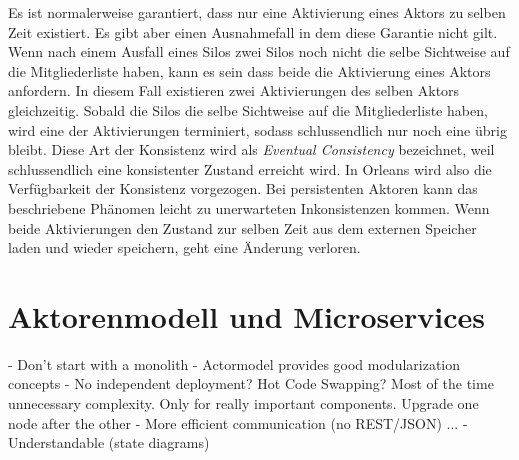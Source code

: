 Es ist normalerweise garantiert, dass nur eine Aktivierung eines Aktors zu selben Zeit existiert. Es gibt aber einen Ausnahmefall in dem diese Garantie nicht gilt. Wenn nach einem Ausfall eines Silos zwei Silos noch nicht die selbe Sichtweise auf die Mitgliederliste haben, kann es sein dass beide die Aktivierung eines Aktors anfordern. In diesem Fall existieren zwei Aktivierungen des selben Aktors gleichzeitig. Sobald die Silos die selbe Sichtweise auf die Mitgliederliste haben, wird eine der Aktivierungen terminiert, sodass schlussendlich nur noch eine übrig bleibt. Diese Art der Konsistenz wird als \textit{Eventual Consistency} bezeichnet, weil schlussendlich eine konsistenter Zustand erreicht wird. In Orleans wird also die Verfügbarkeit der Konsistenz vorgezogen. Bei persistenten Aktoren kann das beschriebene Phänomen leicht zu unerwarteten Inkonsistenzen kommen. Wenn beide Aktivierungen den Zustand zur selben Zeit aus dem externen Speicher laden und wieder speichern, geht eine Änderung verloren.

\pagebreak

\section{Aktorenmodell und Microservices}

- Don't start with a monolith
- Actormodel provides good modularization concepts
- No independent deployment? Hot Code Swapping? Most of the time unnecessary complexity. Only for really important components. Upgrade one node after the other
- More efficient communication (no REST/JSON) ...
- Understandable (state diagrams)

\iffalse

Basic Structure:
- Actor Model Basics
- Erlang
- Elixir
- Virtual Actor Pattern
- Orleans
- Conclusion
  - Different Names: Actors, Processes, Grains ... same principles
	- Different Programming models: function vs oo

\fi